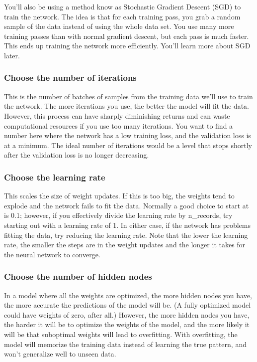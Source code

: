 \documentclass[11pt]{article}
\begin{document}
You'll also be using a method know as Stochastic Gradient Descent (SGD)
to train the network. The idea is that for each training pass, you grab
a random sample of the data instead of using the whole data set. You use
many more training passes than with normal gradient descent, but each
pass is much faster. This ends up training the network more efficiently.
You'll learn more about SGD later.

\subsubsection{Choose the number of
iterations}\label{choose-the-number-of-iterations}

This is the number of batches of samples from the training data we'll
use to train the network. The more iterations you use, the better the
model will fit the data. However, this process can have sharply
diminishing returns and can waste computational resources if you use too
many iterations. You want to find a number here where the network has a
low training loss, and the validation loss is at a minimum. The ideal
number of iterations would be a level that stops shortly after the
validation loss is no longer decreasing.

\subsubsection{Choose the learning rate}\label{choose-the-learning-rate}

This scales the size of weight updates. If this is too big, the weights
tend to explode and the network fails to fit the data. Normally a good
choice to start at is 0.1; however, if you effectively divide the
learning rate by n\_records, try starting out with a learning rate of 1.
In either case, if the network has problems fitting the data, try
reducing the learning rate. Note that the lower the learning rate, the
smaller the steps are in the weight updates and the longer it takes for
the neural network to converge.

\subsubsection{Choose the number of hidden
nodes}\label{choose-the-number-of-hidden-nodes}

In a model where all the weights are optimized, the more hidden nodes
you have, the more accurate the predictions of the model will be. (A
fully optimized model could have weights of zero, after all.) However,
the more hidden nodes you have, the harder it will be to optimize the
weights of the model, and the more likely it will be that suboptimal
weights will lead to overfitting. With overfitting, the model will
memorize the training data instead of learning the true pattern, and
won't generalize well to unseen data.
\end{document}
